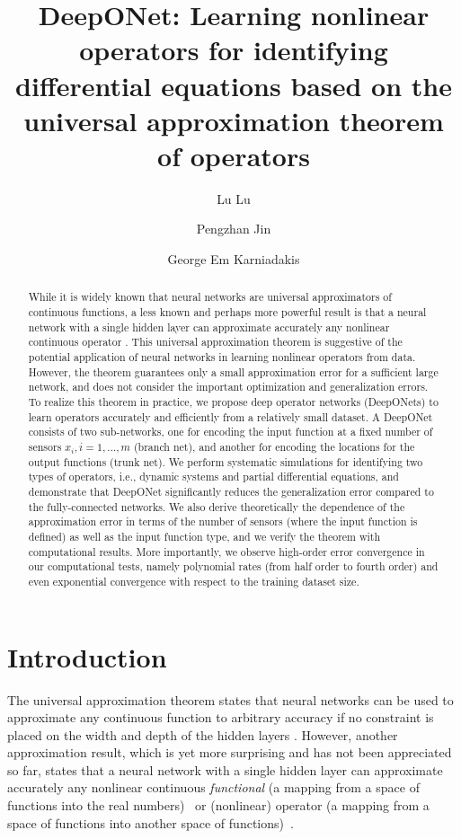 \documentclass[11pt]{article}
\title{DeepONet: Learning nonlinear operators for identifying differential equations based on the universal approximation theorem of operators}
\author[1]{Lu Lu}
\author[2]{Pengzhan Jin}
\author[1]{George Em  Karniadakis}
\affil[1]{Division of Applied Mathematics, Brown University, Providence, RI 02912, USA}
\affil[2]{LSEC, ICMSEC, Academy of Mathematics and Systems Science, Chinese Academy of Sciences, Beijing 100190, China}
\date{}
\begin{document}
\maketitle

\begin{abstract}
While it is widely known that neural networks are universal approximators of continuous functions, a less known and perhaps more powerful result is that a neural network with a single hidden layer can approximate accurately any nonlinear continuous operator \cite{chen1995universal}. This universal approximation theorem is suggestive of the potential application of neural networks in learning nonlinear operators from data. However, the theorem guarantees only a small approximation error for a sufficient large network, and does not consider the important optimization and generalization errors. To realize this theorem in practice, we propose deep operator networks (DeepONets) to learn operators accurately and efficiently from a relatively small dataset. A DeepONet consists of two sub-networks, one for encoding the input function at a fixed number of sensors $x_i, i=1,\dots,m$ (branch net), and another for encoding the locations for the output functions (trunk net).
We perform systematic simulations for identifying two types of operators, i.e., dynamic systems and partial differential equations, and demonstrate that DeepONet significantly reduces the generalization error compared to the fully-connected networks. We also derive theoretically the dependence of the approximation error in terms of the number of sensors (where the input function is defined) as well as the input function type, and we verify the theorem with computational results. More importantly, we observe high-order error convergence in our computational tests, namely polynomial rates (from half order to fourth order) and even exponential convergence with respect to the training dataset size.
\end{abstract}

\section{Introduction}

The universal approximation theorem states that neural networks can be used to approximate any continuous function to arbitrary accuracy if no constraint is placed on the width and depth of the hidden layers \cite{cybenko1989approximation,hornik1989multilayer}. However,
another approximation result, which is yet more surprising and has not been appreciated so far, states that a neural network with 
a single hidden layer can approximate accurately any nonlinear continuous {\em functional} (a mapping from a space of functions into the real numbers)~\cite{chen1993approximations,mhaskar1997neural,rossi2005functional} or (nonlinear) operator (a mapping from a space of functions into another space of functions)~\cite{chen1995universal,chen1995approximation}.
\end{document}
